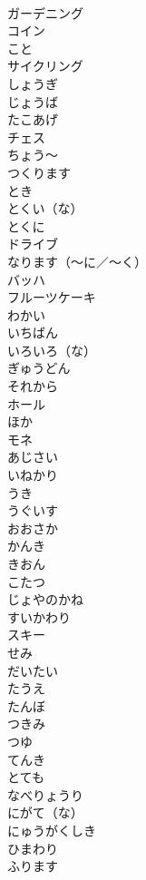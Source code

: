\documentclass[8pt]{extreport}
\begin{document}
\begin{CJK}{UTF8}{min}
\\	ガーデニング	
\\	コイン	
\\	こと	
\\	サイクリング	
\\	しょうぎ	
\\	じょうば	
\\	たこあげ	
\\	チェス	
\\	ちょう～	
\\	つくります	
\\	とき	
\\	とくい（な）	
\\	とくに	
\\	ドライブ	
\\	なります（～に／～く）	
\\	バッハ	
\\	フルーツケーキ	
\\	わかい	
\\	いちばん	
\\	いろいろ（な）	
\\	ぎゅうどん	
\\	それから	
\\	ホール	
\\	ほか	
\\	モネ	
\\	あじさい	
\\	いねかり	
\\	うき	
\\	うぐいす	
\\	おおさか	
\\	かんき	
\\	きおん	
\\	こたつ	
\\	じょやのかね	
\\	すいかわり	
\\	スキー	
\\	せみ	
\\	だいたい	
\\	たうえ	
\\	たんぼ	
\\	つきみ	
\\	つゆ	
\\	てんき	
\\	とても	
\\	なべりょうり	
\\	にがて（な）	
\\	にゅうがくしき	
\\	ひまわり	
\\	ふります	

\end{CJK}
\end{document}
